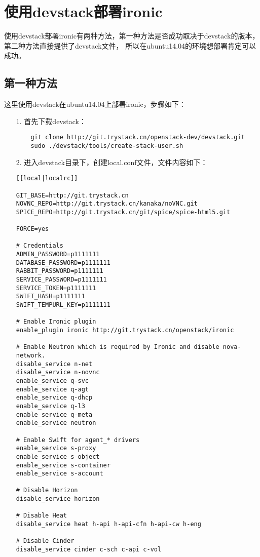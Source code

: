 \documentclass[a4paper,left=1.5cm,right=1.5cm,11pt]{article}
\begin{document}
\tableofcontents

\clearpage

\section{使用devstack部署ironic}
	使用devstack部署ironic有两种方法，第一种方法是否成功取决于devstack的版本，第二种方法直接提供了devstack文件，
	所以在ubuntu14.04的环境想部署肯定可以成功。

\subsection{第一种方法}
	这里使用devstack在ubuntu14.04上部署ironic，步骤如下：
	\begin{itemize}
		\item[1.] 首先下载devstack：
		\begin{lstlisting}
	git clone http://git.trystack.cn/openstack-dev/devstack.git
	sudo ./devstack/tools/create-stack-user.sh
		\end{lstlisting}

		\item[2.] 进入devstack目录下，创建local.conf文件，文件内容如下：
		\begin{lstlisting}
[[local|localrc]]

GIT_BASE=http://git.trystack.cn
NOVNC_REPO=http://git.trystack.cn/kanaka/noVNC.git
SPICE_REPO=http://git.trystack.cn/git/spice/spice-html5.git

FORCE=yes

# Credentials
ADMIN_PASSWORD=p1111111
DATABASE_PASSWORD=p1111111
RABBIT_PASSWORD=p1111111
SERVICE_PASSWORD=p1111111
SERVICE_TOKEN=p1111111
SWIFT_HASH=p1111111
SWIFT_TEMPURL_KEY=p1111111

# Enable Ironic plugin
enable_plugin ironic http://git.trystack.cn/openstack/ironic

# Enable Neutron which is required by Ironic and disable nova-network.
disable_service n-net
disable_service n-novnc
enable_service q-svc
enable_service q-agt
enable_service q-dhcp
enable_service q-l3
enable_service q-meta
enable_service neutron

# Enable Swift for agent_* drivers
enable_service s-proxy
enable_service s-object
enable_service s-container
enable_service s-account

# Disable Horizon
disable_service horizon

# Disable Heat
disable_service heat h-api h-api-cfn h-api-cw h-eng

# Disable Cinder
disable_service cinder c-sch c-api c-vol


\end{lstlisting}
\end{itemize}
\end{document}
